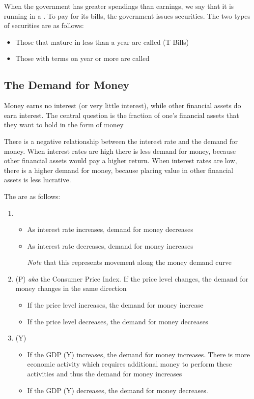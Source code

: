 \documentclass{article}
\begin{document}
When the government has greater spendings than earnings, we say that it is running in a . To pay for its bills, the government issues securities. The two types of securities are as follows:
\begin{itemize}
  \item Those that mature in less than a year are called  (T-Bills)
  \item Those with terms on year or more are called 
\end{itemize}

\subsection{The Demand for Money}

Money earns no interest (or very little interest), while other financial assets do earn interest. The central question is the fraction of one's financial assets that they want to hold in the form of money 

\begin{remark}
  There is a negative relationship between the interest rate and the demand for money. When interest rates are high there is less demand for money, because other financial assets would pay a higher return. When interest rates are low, there is a higher demand for money, because placing value in other financial assets is less lucrative. 
\end{remark}

The  are as follows: 
\begin{enumerate}
  \item {}
    \begin{itemize}
      \item As interest rate increases, demand for money decreases 
      \item As interest rate decreases, demand for money increases 
      \item[\emph{Note}] that this represents movement along the money demand curve
    \end{itemize}
  \item {} (P) \emph{aka} the Consumer Price Index. If the price level changes, the demand for money changes in the same direction
    \begin{itemize}
      \item If the price level increases, the demand for money increase 
      \item If the price level decreases, the demand for money decreases 
    \end{itemize}
  \item {} (Y)
    \begin{itemize}
      \item If the GDP (Y) increases, the demand for money increases. There is more economic activity which requires additional money to perform these activities and thus the demand for money increases
      \item If the GDP (Y) decreases, the demand for money decreases. 
    \end{itemize}
\end{enumerate}
\end{document}
